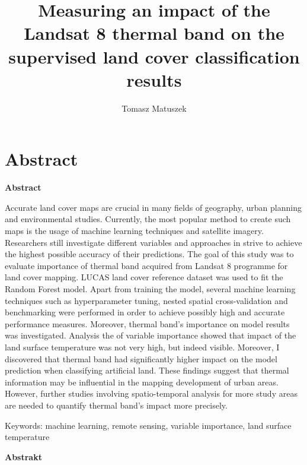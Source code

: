 \documentclass{amuthesis}
\author{Tomasz Matuszek}
\title{Measuring an impact of the Landsat 8 thermal band on the
supervised land cover classification results}
\begin{document}

\titlepage


\hypertarget{abstract}{%
\chapter*{Abstract}\label{abstract}}


\textbf{Abstract}

Accurate land cover maps are crucial in many fields of geography, urban
planning and environmental studies. Currently, the most popular method
to create such maps is the usage of machine learning techniques and
satellite imagery. Researchers still investigate different variables and
approaches in strive to achieve the highest possible accuracy of their
predictions. The goal of this study was to evaluate importance of
thermal band acquired from Landsat 8 programme for land cover mapping.
LUCAS land cover reference dataset was used to fit the Random Forest
model. Apart from training the model, several machine learning
techniques such as hyperparameter tuning, nested spatial
cross-validation and benchmarking were performed in order to achieve
possibly high and accurate performance measures. Moreover, thermal
band's importance on model results was investigated. Analysis the of
variable importance showed that impact of the land surface temperature
was not very high, but indeed visible. Moreover, I discovered that
thermal band had significantly higher impact on the model prediction
when classifying artificial land. These findings suggest that thermal
information may be influential in the mapping development of urban
areas. However, further studies involving spatio-temporal analysis for
more study areas are needed to quantify thermal band's impact more
precisely.

Keywords: machine learning, remote sensing, variable importance, land
surface temperature

\newpage

\textbf{Abstrakt}
\end{document}
